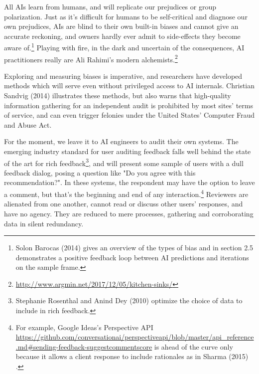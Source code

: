 \documentclass[format=sigconf]{acmart}
\begin{document}
All AIs learn from humans, and will replicate our prejudices or group polarization.  Just as it's difficult for humans to be self-critical and diagnose our own prejudices, AIs are blind to their own built-in biases and cannot give an accurate reckoning, and owners hardly ever admit to side-effects they become aware of.\footnote{Solon Barocas (2014) \citep{barocas2014data} gives an overview of the types of bias and in section 2.5 demonstrates a positive feedback loop between AI predictions and iterations on the sample frame.}  Playing with fire, in the dark and uncertain of the consequences, AI practitioners really are Ali Rahimi's modern alchemists.\footnote{\url{http://www.argmin.net/2017/12/05/kitchen-sinks/}}

Exploring and measuring biases is imperative, and researchers have developed methods which will serve even without privileged access to AI internals.  Christian Sandvig (2014) \citep{Sandvig} illustrates these methods, but also warns that high-quality information gathering for an independent audit is prohibited by most sites' terms of service, and can even trigger felonies under the United States' Computer Fraud and Abuse Act.

For the moment, we leave it to AI engineers to audit their own systems.  The emerging industry standard for user auditing feedback falls well behind the state of the art for rich feedback\footnote{Stephanie Rosenthal and Anind Dey (2010) \citep{Rosenthal2010} optimize the choice of data to include in rich feedback.}, and will present some sample of users with a dull feedback dialog, posing a question like "Do you agree with this recommendation?".  In these systems, the respondent may have the option to leave a comment, but that's the beginning and end of any interaction.\footnote{For example, Google Ideas's Perspective API \url{https://github.com/conversationai/perspectiveapi/blob/master/api_reference.md\#sending-feedback-suggestcommentscore} is ahead of the curve only because it allows a client response to include rationales as in Sharma (2015) \citep{Sharma2015}.}  Reviewers are alienated from one another, cannot read or discuss other users' responses, and have no agency.  They are reduced to mere processes, gathering and corroborating data in silent redundancy.
\end{document}
